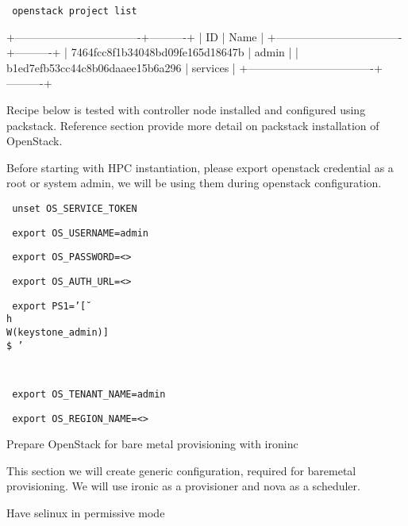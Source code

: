 \documentclass[12pt]{article}
\begin{document}
\begin{bash}\texttt{\small{ openstack project list}}\end{bash}

+----------------------------------+----------+
| ID                               | Name     |
+----------------------------------+----------+
| 7464fcc8f1b34048bd09fe165d18647b | admin    |
| b1ed7efb53cc44c8b06daaee15b6a296 | services |
+----------------------------------+----------+

Recipe below is tested with controller node installed and configured using packstack. Reference section provide more detail on packstack installation of OpenStack.

Before starting with HPC instantiation, please export openstack credential as a root or system admin, we will be using them during openstack configuration. 


\begin{bash}\texttt{\small{ unset OS\_SERVICE\_TOKEN}}\end{bash}
\begin{bash}\texttt{\small{ export OS\_USERNAME=admin}}\end{bash}
\begin{bash}\texttt{\small{ export OS\_PASSWORD=<>}}\end{bash}
\begin{bash}\texttt{\small{ export OS\_AUTH\_URL=<>}}\end{bash}
\begin{bash}\texttt{\small{ export PS1='[\u\@\\h \\W(keystone\_admin)]\\\$ '}}\end{bash}
\begin{bash}\texttt{\small{ }}\end{bash}
\begin{bash}\texttt{\small{ export OS\_TENANT\_NAME=admin}}\end{bash}
\begin{bash}\texttt{\small{ export OS\_REGION\_NAME=<>  }}\end{bash}

Prepare OpenStack for bare metal provisioning with ironinc

This section we will create generic configuration, required for baremetal provisioning. We will use ironic as a provisioner and nova as a scheduler.

Have selinux in permissive mode
\end{document}
